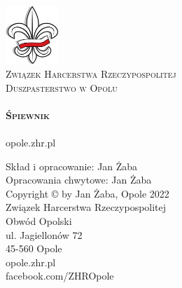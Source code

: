 \begin{titlepage}
	\begin{center}

	\includegraphics[width=0.15\textwidth]{./files/lilijka}
	\\[1cm]
	
	\textsc{\LARGE Związek Harcerstwa Rzeczypospolitej}\\[1.0cm]
	\textsc{\Large Duszpasterstwo w Opolu}\\[1.0cm]
	
	\HRule \\[0.4cm]
	\textsc{{\huge \bfseries Śpiewnik \\[0.4cm] }}
	\HRule \\[1.5cm]
	
	
	\vfill
	{\footnotesize opole.zhr.pl} \\ 
	
	\clearpage
	\thispagestyle{empty} 
	
	\end{center}
	
	\vspace*{\fill}
	\begin{changemargin}{1cm}{1cm} 
		\begin{flushleft}
			Skład i opracowanie: Jan Żaba \\
			Opracowania chwytowe: Jan Żaba \\
		\vspace{0.5cm}
			Copyright © by Jan Żaba, Opole 2022 \\
		\vspace{1cm}
			Związek Harcerstwa Rzeczypospolitej \\
			Obwód Opolski \\
			ul. Jagiellonów 72 \\
			45-560 Opole \\
		\vspace{0.5cm}	
			opole.zhr.pl \\
			facebook.com/ZHROpole
		\end{flushleft}
	\end{changemargin}

	
\end{titlepage}